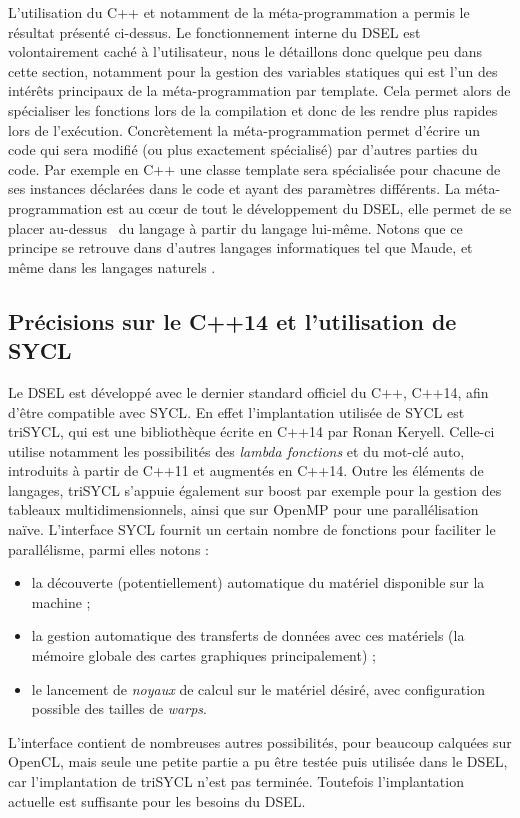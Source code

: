 L'utilisation du \textsf{C++} et notamment de la méta-programmation a permis le résultat présenté ci-dessus. Le fonctionnement interne du DSEL est volontairement caché à l'utilisateur, nous le détaillons donc quelque peu dans cette section, notamment pour la gestion des variables statiques qui est l'un des intérêts principaux de la méta-programmation par template. Cela permet alors de spécialiser les fonctions lors de la compilation et donc de les rendre plus rapides lors de l'exécution. Concrètement la méta-programmation permet d'écrire un code qui sera modifié (ou plus exactement spécialisé) par d'autres parties du code. Par exemple en \textsf{C++} une classe template sera spécialisée pour chacune de ses instances déclarées dans le code et ayant des paramètres différents. La méta-programmation est au cœur de tout le développement du DSEL, elle permet de se placer \og au-dessus \fg~du langage à partir du langage lui-même. Notons que ce principe se retrouve dans d'autres langages informatiques tel que \textsf{Maude}, et même dans les langages naturels \cite{Web6}.

\subsection{Précisions sur le \textsf{C++14} et l'utilisation de \textsf{SYCL}}

Le DSEL est développé avec le dernier standard officiel du \textsf{C++}, \textsf{C++14}, afin d'être compatible avec \textsf{SYCL}. En effet l'implantation utilisée de \textsf{SYCL} est \textsf{triSYCL}, qui est une bibliothèque écrite en \textsf{C++14} par Ronan Keryell. Celle-ci utilise notamment les possibilités des \emph{lambda fonctions} et du mot-clé \textsf{auto}, introduits à partir de \textsf{C++11} et augmentés en \textsf{C++14}. Outre les éléments de langages, \textsf{triSYCL} s'appuie également sur \textsf{boost} par exemple pour la gestion des tableaux multidimensionnels, ainsi que sur \textsf{OpenMP} pour une parallélisation naïve. L'interface \textsf{SYCL} fournit un certain nombre de fonctions pour faciliter le parallélisme, parmi elles notons :
\begin{itemize} 
\item la découverte (potentiellement) automatique du matériel disponible sur la machine ;
\item la gestion automatique des transferts de données avec ces matériels (la mémoire globale des cartes graphiques principalement) ;
\item le lancement de \emph{noyaux} de calcul sur le matériel désiré, avec configuration possible des tailles de \emph{warps}.
\end{itemize}
L'interface contient de nombreuses autres possibilités, pour beaucoup calquées sur \textsf{OpenCL}, mais seule une petite partie a pu être testée puis utilisée dans le DSEL, car l'implantation de \textsf{triSYCL} n'est pas terminée. Toutefois l'implantation actuelle est suffisante pour les besoins du DSEL.

